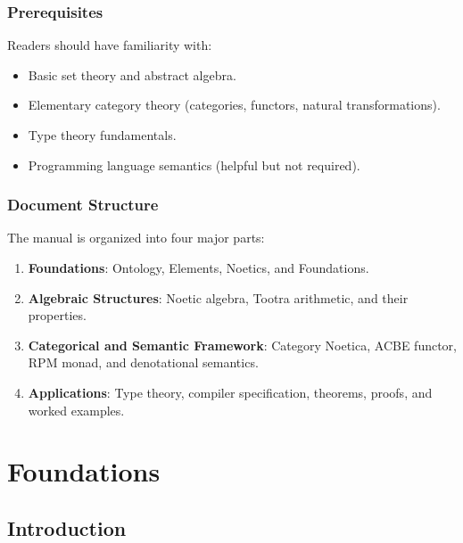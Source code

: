 \documentclass[11pt,twoside,openright]{book}
\theoremstyle{definition}
\theoremstyle{plain}
\theoremstyle{remark}
\begin{document}
\section*{Prerequisites}

Readers should have familiarity with:
\begin{itemize}
  \item Basic set theory and abstract algebra.
  \item Elementary category theory (categories, functors, natural transformations).
  \item Type theory fundamentals.
  \item Programming language semantics (helpful but not required).
\end{itemize}

\section*{Document Structure}

The manual is organized into four major parts:
\begin{enumerate}
  \item \textbf{Foundations}: Ontology, Elements, Noetics, and Foundations.
  \item \textbf{Algebraic Structures}: Noetic algebra, Tootra arithmetic, and their properties.
  \item \textbf{Categorical and Semantic Framework}: Category Noetica, ACBE functor, RPM monad, and denotational semantics.
  \item \textbf{Applications}: Type theory, compiler specification, theorems, proofs, and worked examples.
\end{enumerate}

\mainmatter

\part{Foundations}

\chapter{Introduction}
\label{ch:introduction}
\end{document}
